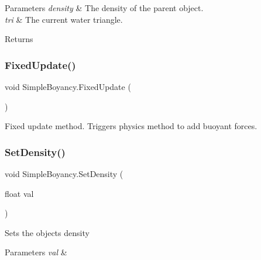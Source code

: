 \begin{DoxyParams}{Parameters}
{\em density} & The density of the parent object.\\
\hline
{\em tri} & The current water triangle.\\
\hline
\end{DoxyParams}
\begin{DoxyReturn}{Returns}

\end{DoxyReturn}
\mbox{\label{class_simple_boyancy_a61d29420919b334a33acc84663eaea57}} 
\subsubsection{\texorpdfstring{Fixed\+Update()}{FixedUpdate()}}
{\footnotesize\ttfamily void Simple\+Boyancy.\+Fixed\+Update (\begin{DoxyParamCaption}{ }\end{DoxyParamCaption})\hspace{0.3cm}{\ttfamily [private]}}



Fixed update method. Triggers physics method to add buoyant forces. 

\mbox{\label{class_simple_boyancy_a87c040d98ee3745e8eb1bb2b91fa1261}} 
\subsubsection{\texorpdfstring{Set\+Density()}{SetDensity()}}
{\footnotesize\ttfamily void Simple\+Boyancy.\+Set\+Density (\begin{DoxyParamCaption}\item[{float}]{val }\end{DoxyParamCaption})}



Sets the object\textquotesingle{}s density 


\begin{DoxyParams}{Parameters}
{\em val} & \\
\hline
\end{DoxyParams}
\mbox{\label{class_simple_boyancy_aaa7adc7a2919cd7c2138fdfa165bd96a}} 
